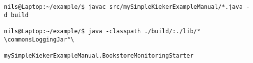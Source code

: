 \begin{lstlisting}
nils@Laptop:~/example/$ javac src/mySimpleKiekerExampleManual/*.java -d build

nils@Laptop:~/example/$ java -classpath ./build/:./lib/°\commonsLoggingJar°\
                        mySimpleKiekerExampleManual.BookstoreMonitoringStarter 
\end{lstlisting}
